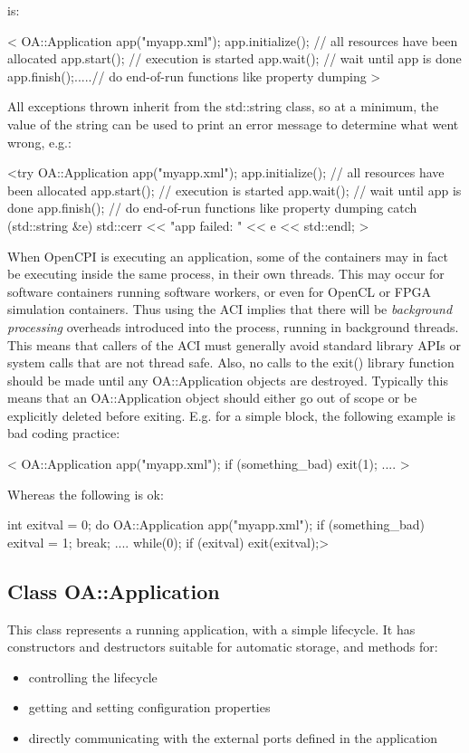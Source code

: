\documentclass[10pt, a4paper, oneside]{article}
\renewcommand\_{\textunderscore\allowbreak} %
\begin{document}
is:\begin{ocpixml}
 < {
    OA::Application app("myapp.xml");
    app.initialize(); // all resources have been allocated
    app.start();      // execution is started
    app.wait();       // wait until app is done
    app.finish();.....// do end-of-run functions like property dumping
  }>\end{ocpixml}
All exceptions thrown inherit from the std::string class, so at a minimum, the value of the string can be used to print an error message to determine what went wrong, e.g.:\begin{ocpixml}  
<try {
    OA::Application app("myapp.xml");
    app.initialize(); // all resources have been allocated
    app.start();      // execution is started
    app.wait();       // wait until app is done
    app.finish();     // do end-of-run functions like property dumping
  } catch (std::string &e) {
    std::cerr << "app failed: " << e << std::endl;
  }>\end{ocpixml}
When OpenCPI is executing an application, some of the containers may in fact be executing inside the same process, in their own threads.  This may occur for software containers running software workers, or even for OpenCL or FPGA simulation containers.  Thus using the ACI implies that there will be \emph{background processing} overheads introduced into the process, running in background threads. \\

This means that callers of the ACI must generally avoid standard library APIs or system calls that are not thread safe. Also, no calls to the exit() library function should be made until any OA::Application objects are destroyed.  Typically this means that an OA::Application object should either go out of scope or be explicitly deleted before exiting. E.g. for a simple block, the following example is bad coding practice:\begin{ocpixml}
<  {
    OA::Application app("myapp.xml");
    if (something_bad)
      exit(1);
    ....
  }>\end{ocpixml}

Whereas the following is ok:\begin{ocpixml}
  int exitval = 0;
  do {
    OA::Application app("myapp.xml");
    if (something_bad) {
      exitval = 1;
      break;
    }
    ....
  } while(0);
  if (exitval)
 exit(exitval);>\end{ocpixml}
\subsection{Class OA::Application} This class represents a running application, with a simple lifecycle. It has constructors and destructors suitable for automatic storage, and methods for:\begin{itemize}
\item controlling the lifecycle
\item getting and setting configuration properties
\item directly communicating with the external ports defined in the application
\end{itemize}
\end{document}

